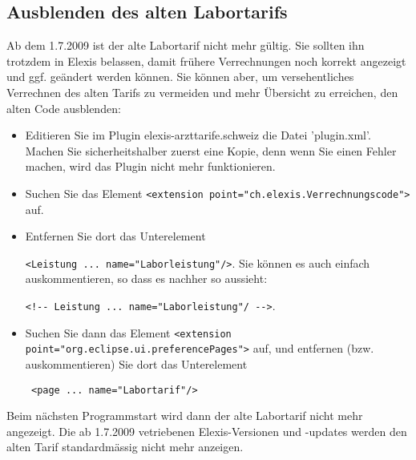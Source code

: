 \documentclass[a4paper]{scrartcl}
\begin{document}
\subsection{Ausblenden des alten Labortarifs}
Ab dem 1.7.2009 ist der alte Labortarif nicht mehr gültig. Sie sollten ihn trotzdem in Elexis belassen, damit frühere Verrechnungen noch korrekt angezeigt und ggf. geändert werden können. Sie können aber, um versehentliches Verrechnen des alten Tarifs zu vermeiden und mehr Übersicht zu erreichen, den alten Code ausblenden:
\begin{itemize}
\item Editieren Sie im Plugin elexis-arzttarife.schweiz die Datei 'plugin.xml'. Machen Sie sicherheitshalber zuerst eine Kopie, denn wenn Sie einen Fehler machen, wird das Plugin nicht mehr funktionieren.
\item Suchen Sie das Element \verb|<extension point="ch.elexis.Verrechnungscode">| auf.
\item Entfernen Sie dort das Unterelement 

\verb|<Leistung ... name="Laborleistung"/>|. Sie können es auch einfach auskommentieren, so dass es nachher so aussieht:

     \verb|<!-- Leistung ... name="Laborleistung"/ -->|.
\item Suchen Sie dann das Element \verb|<extension point="org.eclipse.ui.preferencePages">| auf, und entfernen (bzw. auskommentieren) Sie dort das Unterelement

     \verb| <page ... name="Labortarif"/>|
\end{itemize}

Beim nächsten Programmstart wird dann der alte Labortarif nicht mehr angezeigt. Die ab 1.7.2009 vetriebenen Elexis-Versionen und -updates werden den alten Tarif standardmässig nicht mehr anzeigen.
\end{document}
